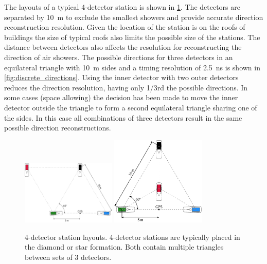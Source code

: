 The layouts of a typical 4-detector station is shown in \cref{fig:4_detector_layouts}. The detectors are separated by \SI{10}{\meter} to exclude the smallest showers and provide accurate direction reconstruction resolution. Given the location of the station is on the roofs of buildings the size of typical roofs also limits the possible size of the stations. The distance between detectors also affects the resolution for reconstructing the direction of air showers. The possible directions for three detectors in an equilateral triangle with \SI{10}{\meter} sides and a timing resolution of \SI{2.5}{\ns} is shown in \cref{fig:discrete_directions}. Using the inner detector with two outer detectors reduces the direction resolution, having only 1/3rd the possible directions. In some cases (space allowing) the decision has been made to move the inner detector outside the triangle to form a second equilateral triangle sharing one of the sides. In this case all combinations of three detectors result in the same possible direction reconstructions.

\begin{figure}
    \centering
    \includegraphics[width=0.4\textwidth]
                    {plots/experiment/4_detector_diamond}
    \includegraphics[width=0.4\textwidth]
                    {plots/experiment/4_detector_star}
    \caption{4-detector station layouts. 4-detector stations are typically placed in the diamond or star formation. Both contain multiple triangles between sets of 3 detectors.}
    \label{fig:4_detector_layouts}
\end{figure}

